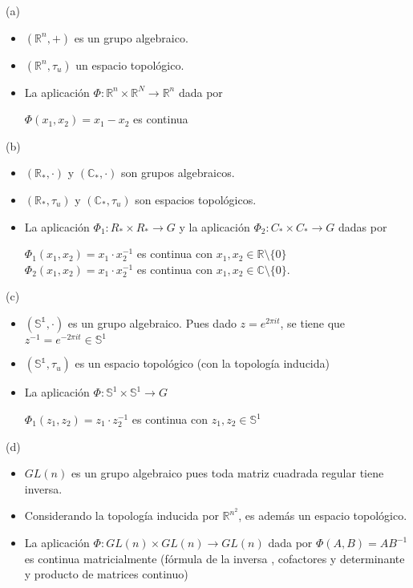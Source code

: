 \documentclass[
  a4paper,
  spanish,
  12pt,
]{scrartcl}
\begin{document}
\begin{sol}

(a)

\begin{itemize}
\item{$(\mathbb{R}^n, +)$ es un grupo algebraico.}
\item{$(\mathbb{R}^n, \tau_u)$ un espacio topológico.}
\item{La aplicación $\Phi: \mathbb{R}^n \times \mathbb{R}^N \rightarrow \mathbb{R}^n$ dada por

$\Phi(x_1, x_2) = x_1 - x_2$ es continua}
\end{itemize}

(b)

\begin{itemize}
\item{$(\mathbb{R_*}, \cdot)$ y $(\mathbb{C_*}, \cdot)$ son grupos algebraicos.}
\item{$(\mathbb{R_*}, \tau_u)$ y $(\mathbb{C_*}, \tau_u)$ son espacios topológicos.}
\item{La aplicación $\Phi_1: R_* \times R_* \rightarrow G$  y la 
aplicación $\Phi_2: C_* \times C_* \rightarrow G$ dadas por
	
$\Phi_1(x_1, x_2) = x_1 \cdot x_2^{-1}$ es continua con $x_1, x_2 \in \mathbb{R} \setminus \{0\}$ \\
$\Phi_2(x_1, x_2) = x_1 \cdot x_2^{-1}$ es continua con $x_1, x_2 \in \mathbb{C} \setminus \{0\}$.}
\end{itemize}

(c)


\begin{itemize}
\item{$(\mathbb{S^1}, \cdot)$ es un grupo algebraico. Pues dado $z=e^{2\pi it}$, se tiene que $z^{-1}=e^{-2\pi it} \in \mathbb{S}^1$}
\item{$(\mathbb{S^1}, \tau_u)$ es un espacio topológico (con la topología inducida)}
\item{La aplicación $\Phi: \mathbb{S}^1 \times \mathbb{S}^1 \rightarrow G$  
	
$\Phi_1(z_1, z_2) = z_1 \cdot z_2^{-1}$ es continua con $z_1, z_2 \in \mathbb{S}^1$ \\
}
\end{itemize}

(d) 

\begin{itemize}
\item{$GL(n)$ es un grupo algebraico pues toda matriz cuadrada regular tiene inversa.}
\item{Considerando la topología inducida por $\mathbb{R}^{n^2}$, es además un espacio topológico.}
\item{La aplicación $\Phi: GL(n) \times GL(n) \rightarrow GL(n)$ dada por $\Phi(A, B) = AB^{-1}$
es continua matricialmente (fórmula de la inversa , cofactores y determinante y producto de matrices continuo)}
\end{itemize}


\end{sol}
\end{document}
